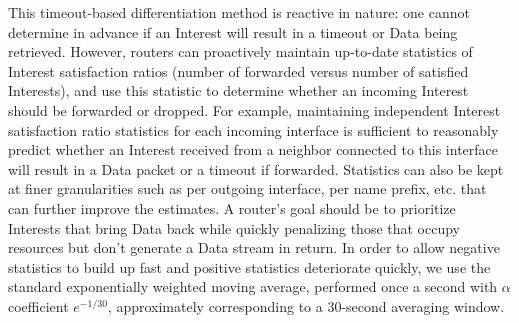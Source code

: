 This timeout-based differentiation method is reactive in nature: one cannot determine in advance if an Interest will result in a timeout or Data being retrieved. However, routers can proactively maintain up-to-date statistics of Interest satisfaction ratios (number of forwarded versus number of satisfied Interests), and use this statistic to determine whether an incoming Interest should be forwarded or dropped. For example, maintaining independent Interest satisfaction ratio statistics for each incoming interface is sufficient to reasonably predict whether an Interest received from a neighbor connected to this interface will result in a Data packet or a timeout if forwarded. Statistics can also be kept at finer granularities such as per outgoing interface, per name prefix, etc. that can further improve the estimates. A router's goal should be to prioritize Interests that bring Data back while quickly penalizing those that occupy resources but don't generate a Data stream in return. In order to allow negative statistics to build up fast and positive statistics deteriorate quickly, we use the standard exponentially weighted moving average, performed once a second with $\alpha$ coefficient $e^{-1/30}$, approximately corresponding to a 30-second averaging window.




